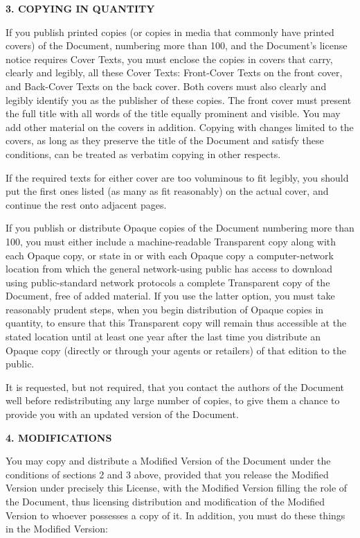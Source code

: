 \documentclass{scrbook}
\begin{document}
\begin{center}
{\Large\bfseries 3. COPYING IN QUANTITY\par}
\end{center}
If you publish printed copies (or copies in media that commonly have
printed covers) of the Document, numbering more than 100, and the
Document's license notice requires Cover Texts, you must enclose the
copies in covers that carry, clearly and legibly, all these Cover
Texts: Front-Cover Texts on the front cover, and Back-Cover Texts on
the back cover.  Both covers must also clearly and legibly identify
you as the publisher of these copies.  The front cover must present
the full title with all words of the title equally prominent and
visible.  You may add other material on the covers in addition.
Copying with changes limited to the covers, as long as they preserve
the title of the Document and satisfy these conditions, can be treated
as verbatim copying in other respects.

If the required texts for either cover are too voluminous to fit
legibly, you should put the first ones listed (as many as fit
reasonably) on the actual cover, and continue the rest onto adjacent
pages.

If you publish or distribute Opaque copies of the Document numbering
more than 100, you must either include a machine-readable Transparent
copy along with each Opaque copy, or state in or with each Opaque copy
a computer-network location from which the general network-using
public has access to download using public-standard network protocols
a complete Transparent copy of the Document, free of added material.
If you use the latter option, you must take reasonably prudent steps,
when you begin distribution of Opaque copies in quantity, to ensure
that this Transparent copy will remain thus accessible at the stated
location until at least one year after the last time you distribute an
Opaque copy (directly or through your agents or retailers) of that
edition to the public.

It is requested, but not required, that you contact the authors of the
Document well before redistributing any large number of copies, to give
them a chance to provide you with an updated version of the Document.


\begin{center}
{\Large\bfseries 4. MODIFICATIONS\par}
\end{center}
You may copy and distribute a Modified Version of the Document under
the conditions of sections 2 and 3 above, provided that you release
the Modified Version under precisely this License, with the Modified
Version filling the role of the Document, thus licensing distribution
and modification of the Modified Version to whoever possesses a copy
of it.  In addition, you must do these things in the Modified Version:
\end{document}
